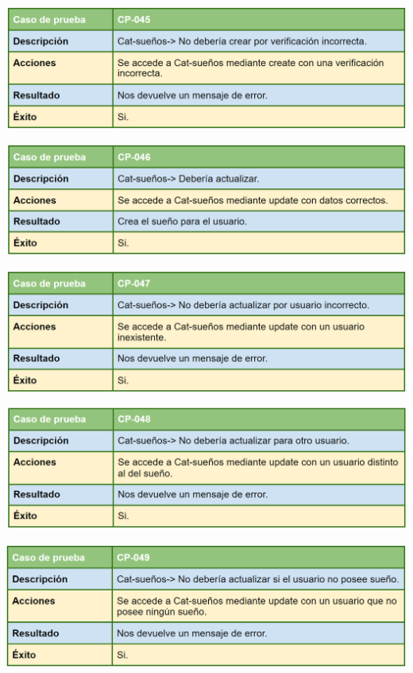 \bigskip

\includegraphics[width=\textwidth]{img/cap7/cp-045.png}

\bigskip

\includegraphics[width=\textwidth]{img/cap7/cp-046.png}

\bigskip

\includegraphics[width=\textwidth]{img/cap7/cp-047.png}

\bigskip

\includegraphics[width=\textwidth]{img/cap7/cp-048.png}

\bigskip

\includegraphics[width=\textwidth]{img/cap7/cp-049.png}

